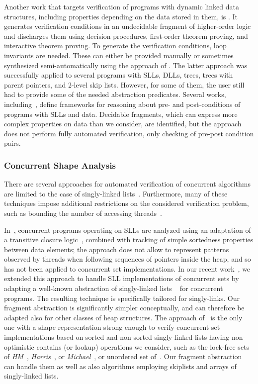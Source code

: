 Another work that targets verification of programs with dynamic linked data
structures, including properties depending on the data stored in them, is
\cite{Hongseok:SL}. It generates verification conditions in an undecidable
fragment of higher-order logic and discharges them using decision procedures,
first-order theorem proving, and interactive theorem proving. To generate the
verification conditions, loop invariants are needed. These can either be
provided manually or sometimes synthesized semi-automatically using the approach
of \cite{SagivRW02}. The latter approach was successfully applied to several
programs with SLLs, DLLs, trees, trees with parent pointers, and 2-level skip
lists. However, for some of them, the user still had to provide some of the
needed abstraction predicates.
Several works, including~\cite{dragoi:atva12}, define frameworks for reasoning
about pre- and post-conditions of programs with SLLs and data. Decidable
fragments, which can express more complex properties on data than we consider,
are identified, but the approach does not perform fully automated verification,
only checking of pre-post condition pairs.


\subsubsection{Concurrent Shape Analysis}
There are several approaches for automated verification of concurrent algorithms are limited to the
case of singly-linked
lists~\cite{AHHR:integrated,meyer:vmcai16,Quy:sas16,Sagiv:correlation,Vafeiadis:cav10}.
Furthermore, many of these techniques impose additional restrictions on the considered verification problem, such as bounding the number of accessing
threads~\cite{Amit:comparisonAbstraction,Vechev:spin09,CernyRZCA:CAV10}.

In~\cite{AHHR:integrated}, concurrent programs operating on SLLs are analyzed
using an adaptation of a transitive closure logic~\cite{BiRa:vmcai06}, combined with
tracking of simple sortedness properties between data elements; the approach does
not allow to represent patterns observed by threads when following sequences of
pointers inside the heap, and so has not been applied to concurrent set
implementations.
In our recent work~\cite{Quy:sas16}, we extended this approach to handle SLL implementations
of concurrent sets by adapting a
well-known abstraction of singly-linked lists ~\cite{MYRS:Canonical} for concurrent programs.
The resulting technique is specifically tailored for singly-links.
Our fragment abstraction is significantly simpler conceptually, and can therefore be  adapted
also for other classes of heap structures.
The approach of~\cite{Quy:sas16} is the only one with a shape representation strong enough to
verify  concurrent set
implementations based on sorted and non-sorted
singly-linked lists having non-optimistic contains (or lookup) operations we consider, such as
the lock-free sets of {\it HM}~\cite{ArtOfMpP},
{\it Harris}~\cite{Harris:list}, or {\it Michael}~\cite{Michael:list},
or unordered set of~\cite{Zhang:unorderedlist}. Our fragment abstraction can handle them
as well as also algorithms employing skiplists and arrays of singly-linked lists.


